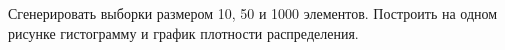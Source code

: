 \item Сгенерировать выборки размером 10, 50 и 1000 элементов.
Построить на одном рисунке гистограмму и график плотности распределения.